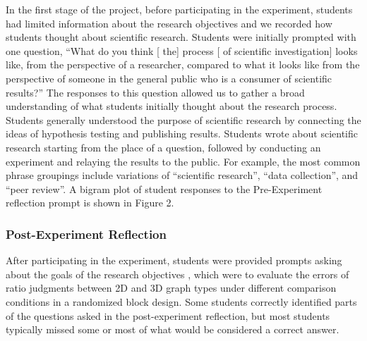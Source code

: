 \documentclass[
  12pt,
]{article}
\providecommand{\DIFdel}[1]{} %
\providecommand{\DIFadd}[1]{{\protect\color{blue} \sf #1}} %
\providecommand{\DIFdel}[1]{{\protect\color{red} [..\footnote{removed: #1} ]}} %
\providecommand{\DIFaddbegin}{} %
\providecommand{\DIFaddend}{} %
\providecommand{\DIFdelbegin}{} %
\providecommand{\DIFdelend}{} %
\newcommand{\DIFscaledelfig}{0.5}
\newlength{\DIFdelgraphicswidth} %
\newlength{\DIFdelgraphicsheight} %
\newcommand{\DIFaddincludegraphics}[2][]{{\color{blue}\fbox{\DIFOincludegraphics[#1]{#2}}}} %
\newcommand{\DIFdelincludegraphics}[2][]{%
\sbox{\DIFdelgraphicsbox}{\DIFOincludegraphics[#1]{#2}}%
\settoboxwidth{\DIFdelgraphicswidth}{\DIFdelgraphicsbox} %
\settoboxtotalheight{\DIFdelgraphicsheight}{\DIFdelgraphicsbox} %
\scalebox{\DIFscaledelfig}{%
\parbox[b]{\DIFdelgraphicswidth}{\usebox{\DIFdelgraphicsbox}\\[-\baselineskip] \rule{\DIFdelgraphicswidth}{0em}}\llap{\resizebox{\DIFdelgraphicswidth}{\DIFdelgraphicsheight}{%
\setlength{\unitlength}{\DIFdelgraphicswidth}%
\begin{picture}(1,1)%
\thicklines\linethickness{2pt} %
{\color[rgb]{1,0,0}\put(0,0){\framebox(1,1){}}}%
{\color[rgb]{1,0,0}\put(0,0){\line( 1,1){1}}}%
{\color[rgb]{1,0,0}\put(0,1){\line(1,-1){1}}}%
\end{picture}%
}\hspace*{3pt}}} %
} %
\DeclareRobustCommand{\DIFaddbegin}{\DIFOaddbegin \let\includegraphics\DIFaddincludegraphics} %
\DeclareRobustCommand{\DIFaddend}{\DIFOaddend \let\includegraphics\DIFOincludegraphics} %
\DeclareRobustCommand{\DIFdelbegin}{\DIFOdelbegin \let\includegraphics\DIFdelincludegraphics} %
\DeclareRobustCommand{\DIFdelend}{\DIFOaddend \let\includegraphics\DIFOincludegraphics} %
\begin{document}
In the first stage of the project, \DIFaddbegin \DIFadd{before participating in the
experiment, }\DIFaddend students had limited information about the research
objectives and we recorded how students thought about scientific
research. \DIFdelbegin \DIFdel{Before to theexperiment, students }\DIFdelend \DIFaddbegin \DIFadd{Students were initially prompted with one question, ``What do
you think }{[}\DIFadd{the}{]} \DIFadd{process }{[}\DIFadd{of scientific investigation}{]} \DIFadd{looks
like, from the perspective of a researcher, compared to what it looks
like from the perspective of someone in the general public who is a
consumer of scientific results?'' The responses to this question allowed
us to gather a broad understanding of what students initially thought
about the research process. Students }\DIFaddend generally understood the purpose of
scientific research by connecting the ideas of hypothesis testing and
publishing results\DIFdelbegin \DIFdel{as demonstrated in the
Pre-Experiment bigram plot from the Pre-Experiment Reflection (Figure
2)}\DIFdelend . Students wrote about scientific research starting
from the place of a question, followed by conducting an experiment and
relaying the results to the public. For example, the most common phrase
groupings include variations of ``scientific research'', ``data
collection'', and ``peer review''. \DIFaddbegin \DIFadd{A bigram plot of student responses to
the Pre-Experiment reflection prompt is shown in Figure 2.
}\DIFaddend 

\subsubsection{Post-Experiment
Reflection}\label{post-experiment-reflection}

After participating in the experiment, students were provided prompts
asking about the goals of the research objectives\DIFaddbegin \DIFadd{, which were to
evaluate the errors of ratio judgments between 2D and 3D graph types
under different comparison conditions in a randomized block design}\DIFaddend . Some
students correctly identified parts of the questions asked in the
post-experiment reflection, but \DIFdelbegin \DIFdel{often missed the objective of comparing the accuracy of
ratio judgements of 2D and 3D graphs}\DIFdelend \DIFaddbegin \DIFadd{most students typically missed some or
most of what would be considered a correct answer}\DIFaddend .
\end{document}
